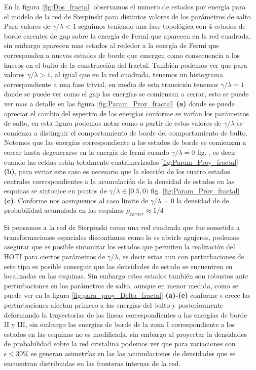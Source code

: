 En la figura \ref{fig:Dos_fractal} observamos el numero de estados por energía para el modelo de la red de Sierpinski para distintos valores de los parámetros de salto. Para valores de $\gamma/\lambda < 1$ seguimos teniendo una fase topológica con 4 estados de borde carentes de gap sobre la energía de Fermi que aparecen en la red cuadrada, sin embargo aparecen mas estados al rededor a la energía de Fermi que corresponden a nuevos estados de borde que emergen como consecuencia a los huecos en el bulto de la construcción del fractal. También podemos ver que para valores $\gamma/\lambda > 1$, al igual que en la red cuadrada, tenemos un histograma correspondiente a una fase trivial, en medio de esta transición tenemos $\gamma/\lambda = 1$ donde se puede ver como el gap las energías se comienzan a cerrar, esto se puede ver mas a detalle en las figura \ref{fig:Param_Proy_fractal} \textbf{(a)} donde se puede apreciar el cambio del espectro de las energías conforme se varían los parámetros de salto, en esta figura podemos notar como a partir de estos valores de $\gamma/\lambda$ se comienza a distinguir el comportamiento de borde del comportamiento de bulto. Notemos que las energías correspondiente a los estados de borde se comienzan a cerrar hasta degenerarse en la energía de fermi cuando $\gamma/\lambda = 0$ fig. , es decir cuando las celdas están totalmente cuatrimerizadas \ref{fig:Param_Proy_fractal} \textbf{(b)}, para evitar este caso es necesario que la elección de los cuatro estados centrales correspondientes a la acumulación de la densidad de estados en las esquinas se sintonice en puntos de $\gamma/\lambda \in [0.5,0)$ fig. \ref{fig:Param_Proy_fractal} \textbf{(c)}. Conforme nos acerquemos al caso limite de $\gamma/\lambda = 0$ la densidad de de probabilidad acumulada en las esquinas $\rho_{corner} \approx 1/4$ 




Si pensamos a la red de Sierpinski como una red cuadrada que fue sometida a transformaciones espaciales discontinuas como lo es abrirle agujeros, podemos asegurar que es posible sintonizar los estados que permiten la realización del HOTI  para ciertos parámetros de $\gamma/\lambda$, es decir estas aun con perturbaciones de este tipo es posible conseguir que las densidades de estado se encuentren en localizadas en las esquinas.
Sin embargo estos estados también son robustos ante perturbaciones en los parámetros de salto, aunque en menor medida, como se puede ver en la figura \ref{fig:para_proy_Delta_fractal} \textbf{(a)-(e)} conforme $\epsilon$ crece las perturbaciones afectan primero a las energías del bulto y posteriormente deformando la trayectorias de las lineas correspondientes a las energías de borde II y III, sin embargo las energías de borde de la zona I correspondiente a los estados en las esquinas no es modificada, sin embargo al proyectar la densidades de probabilidad sobre la red cristalina podemos ver que para variaciones con $\epsilon \leq 30\%$ se generan asimetrías en las las acumulaciones de densidades que se encuentran distribuidas en las fronteras internas de la red.



